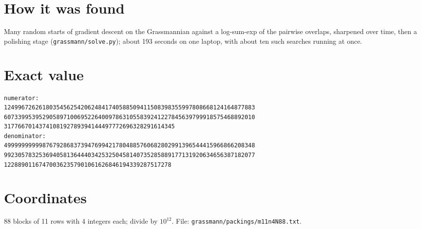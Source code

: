 \documentclass[11pt,a4paper]{article}
\begin{document}
\section{How it was found}
Many random starts of gradient descent on the Grassmannian against a log-sum-exp of the pairwise overlaps, sharpened over time, then a polishing stage (\texttt{grassmann/solve.py}); about 193 seconds on one laptop, with about ten such searches running at once.


\appendix
\section{Exact value}
{\small
\begin{verbatim}
numerator:
124996726261803545625420624841740588509411508398355997808668124164877883
607339953952905897100695226400978631055839241227845639799918575468892010
3177667014374108192789394144497772696328291614345
denominator:
499999999998767928683739476994217804885760682802991396544415966866208348
992305783253694058136444034253250458140735285889177131920634656387182077
122889011674700362357901061626846194339287517278
\end{verbatim}}

\section{Coordinates}
88 blocks of 11 rows with 4 integers each; divide by $10^{12}$. File: \texttt{grassmann/packings/m11n4N88.txt}.
{\tiny
\begin{multicols}{3}
\end{multicols}}
\end{document}
